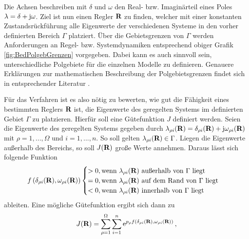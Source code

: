 Die Achsen beschreiben mit $\delta$ und $\omega$ den Real- bzw. Imaginärteil eines Poles $\lambda = \delta +\textnormal{j}\omega$.
Ziel ist nun einen Regler $\textbf{R}$ zu finden, welcher mit einer konstanten Zustandsrückführung alle Eigenwerte der verschiedenen Systeme in den vorher definierten Bereich $\Gamma$ platziert.
Über die Gebietsgrenzen von $\Gamma$ werden Anforderungen an Regel- bzw. Systemdynamiken entsprechend obiger Grafik \ref{fig:BedPolgebGrenzen} vorgegeben.
Dabei kann es auch sinnvoll sein, unterschiedliche Polgebiete für die einzelnen Modelle zu definieren. Genauere Erklärungen zur mathematischen Beschreibung der Polgebietsgrenzen findet sich in entsprechender Literatur \cite{RobReg}.

Für das Verfahren ist es also nötig zu bewerten, wie gut die Fähigkeit eines bestimmten Reglers $\textbf{R}$ ist, die Eigenwerte des geregelten Systems im definierten Gebiet $\Gamma$ zu platzieren.
Hierfür soll eine Gütefunktion $J$ definiert werden. 
Seien die Eigenwerte des geregelten Systems gegeben durch 
$\lambda_{\rho i}(\textbf{R}) = \delta_{\rho i} (\textbf{R}) + \textnormal{j} \omega_{\rho i}(\textbf{R}) $ 
mit $\rho = 1,...,\Omega$ und $i = 1, ..., n$.
So soll gelten $\lambda_{\rho i}(\textbf{R}) \in \Gamma$. Liegen die Eigenwerte außerhalb des Bereichs, so soll $J(\textbf{R})$ große Werte annehmen.
Daraus lässt sich folgende Funktion 
\begin{equation}
	f\left(\delta_{\rho i}(\textbf{R}) ,\omega_{\rho i}(\textbf{R})\right) 
	\begin{cases}
		> 0 , \textnormal{wenn } \lambda_{\rho i}(\textbf{R}) \textnormal{ außerhalb von } \Gamma \textnormal{ liegt} \\
		= 0 , \textnormal{wenn } \lambda_{\rho i}(\textbf{R}) \textnormal{ auf dem Rand von } \Gamma \textnormal{ liegt} \\
		< 0 , \textnormal{wenn } \lambda_{\rho i}(\textbf{R}) \textnormal{ innerhalb von } \Gamma \textnormal{ liegt} \\
	\end{cases}
\end{equation}
ableiten.
Eine mögliche Gütefunktion ergibt sich dann zu 
\begin{equation}\label{eq:GueteMExp}
	J(\textbf{R}) = \sum_{\rho = 1}^{\Omega} \sum_{i=1}^{n} \mathrm{e}^{p_\rho f\left(\delta_{\rho i}(\textbf{R}) ,\omega_{\rho i}(\textbf{R})\right)}\,,
\end{equation}

